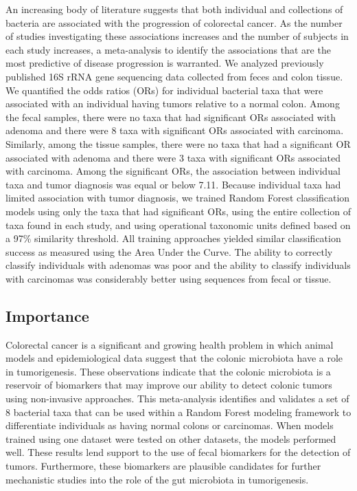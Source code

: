 \documentclass[12pt,]{article}
\begin{document}
An increasing body of literature suggests that both individual and
collections of bacteria are associated with the progression of
colorectal cancer. As the number of studies investigating these
associations increases and the number of subjects in each study
increases, a meta-analysis to identify the associations that are the
most predictive of disease progression is warranted. We analyzed
previously published 16S rRNA gene sequencing data collected from feces
and colon tissue. We quantified the odds ratios (ORs) for individual
bacterial taxa that were associated with an individual having tumors
relative to a normal colon. Among the fecal samples, there were no taxa
that had significant ORs associated with adenoma and there were 8 taxa
with significant ORs associated with carcinoma. Similarly, among the
tissue samples, there were no taxa that had a significant OR associated
with adenoma and there were 3 taxa with significant ORs associated with
carcinoma. Among the significant ORs, the association between individual
taxa and tumor diagnosis was equal or below 7.11. Because individual
taxa had limited association with tumor diagnosis, we trained Random
Forest classification models using only the taxa that had significant
ORs, using the entire collection of taxa found in each study, and using
operational taxonomic units defined based on a 97\% similarity
threshold. All training approaches yielded similar classification
success as measured using the Area Under the Curve. The ability to
correctly classify individuals with adenomas was poor and the ability to
classify individuals with carcinomas was considerably better using
sequences from fecal or tissue.

\newpage

\subsection{Importance}\label{importance}

Colorectal cancer is a significant and growing health problem in which
animal models and epidemiological data suggest that the colonic
microbiota have a role in tumorigenesis. These observations indicate
that the colonic microbiota is a reservoir of biomarkers that may
improve our ability to detect colonic tumors using non-invasive
approaches. This meta-analysis identifies and validates a set of 8
bacterial taxa that can be used within a Random Forest modeling
framework to differentiate individuals as having normal colons or
carcinomas. When models trained using one dataset were tested on other
datasets, the models performed well. These results lend support to the
use of fecal biomarkers for the detection of tumors. Furthermore, these
biomarkers are plausible candidates for further mechanistic studies into
the role of the gut microbiota in tumorigenesis.
\end{document}
